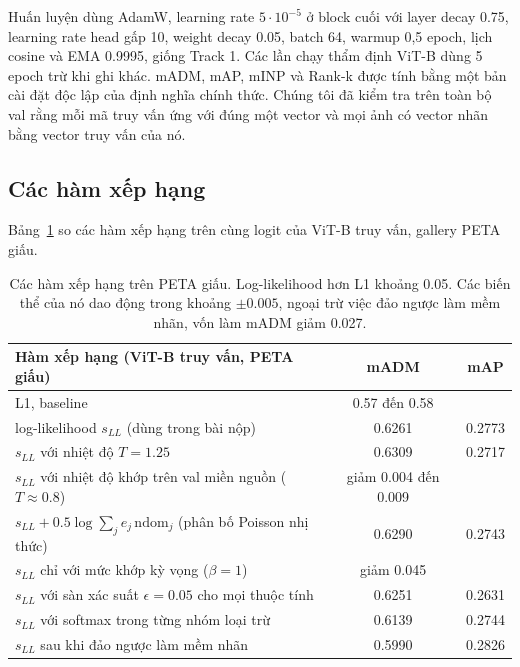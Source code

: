 \documentclass[11pt,a4paper]{article}
\newcommand{\ndom}{\mathrm{ndom}}
\begin{document}
Huấn luyện dùng AdamW, learning rate $5\cdot10^{-5}$ ở block cuối với layer decay 0.75, learning rate head gấp 10, weight decay 0.05, batch 64, warmup 0,5 epoch, lịch cosine và EMA 0.9995, giống Track 1. Các lần chạy thẩm định ViT-B dùng 5 epoch trừ khi ghi khác. mADM, mAP, mINP và Rank-k được tính bằng một bản cài đặt độc lập của định nghĩa chính thức. Chúng tôi đã kiểm tra trên toàn bộ val rằng mỗi mã truy vấn ứng với đúng một vector và mọi ảnh có vector nhãn bằng vector truy vấn của nó.

\subsection{Các hàm xếp hạng}
\label{sec:scorefns}

Bảng~\ref{tab:scores} so các hàm xếp hạng trên cùng logit của ViT-B truy vấn, gallery PETA giấu.

\begin{table}[H]
\centering\small
\begin{tabularx}{\linewidth}{@{}Xcc@{}}
\toprule
Hàm xếp hạng (ViT-B truy vấn, PETA giấu) & mADM & mAP \\
\midrule
L1, baseline~\cite{upar} & 0.57 đến 0.58 & \\
log-likelihood $s_{LL}$ (dùng trong bài nộp) & 0.6261 & 0.2773 \\
$s_{LL}$ với nhiệt độ $T=1.25$ & 0.6309 & 0.2717 \\
$s_{LL}$ với nhiệt độ khớp trên val miền nguồn ($T\approx0.8$) & giảm 0.004 đến 0.009 & \\
$s_{LL}+0.5\log\sum_j e_j\,\ndom_j$ (phân bố Poisson nhị thức) & 0.6290 & 0.2743 \\
$s_{LL}$ chỉ với mức khớp kỳ vọng ($\beta=1$) & giảm 0.045 & \\
$s_{LL}$ với sàn xác suất $\epsilon=0.05$ cho mọi thuộc tính & 0.6251 & 0.2631 \\
$s_{LL}$ với softmax trong từng nhóm loại trừ & 0.6139 & 0.2744 \\
$s_{LL}$ sau khi đảo ngược làm mềm nhãn & 0.5990 & 0.2826 \\
\bottomrule
\end{tabularx}
\caption{Các hàm xếp hạng trên PETA giấu. Log-likelihood hơn L1 khoảng 0.05. Các biến thể của nó dao động trong khoảng $\pm0.005$, ngoại trừ việc đảo ngược làm mềm nhãn, vốn làm mADM giảm 0.027.}
\label{tab:scores}
\end{table}
\end{document}
